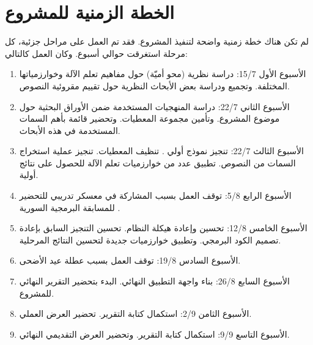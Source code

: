 \section{الخطة الزمنية للمشروع}
لم تكن هناك خطة زمنية واضحة لتنفيذ المشروع.
فقد تم العمل على مراحل جزئية، كل مرحلة استغرقت حوالي أسبوع.
وكان العمل كالتالي:
\begin{enumerate}
	\item 
	الأسبوع الأول 15/7:
	دراسة نظرية (محو أميّة) حول مفاهيم تعلم الآلة وخوارزمياتها المختلفة.
	وتجميع ودراسة بعض الأبحاث النظرية حول تقييم مقروئية النصوص.
	\item
	الأسبوع الثاني 22/7:
	دراسة المنهجيات المستخدمة ضمن الأوراق البحثية حول موضوع المشروع.
	وتأمين مجموعة المعطيات.
	وتحضير قائمة بأهم السمات المستخدمة في هذه الأبحاث.
	\item
	الأسبوع الثالث 22/7:
	تنجيز نموذج أولي .
	تنظيف المعطيات.
	تنجيز عملية استخراج السمات من النصوص.
	تطبيق عدد من خوارزميات تعلم الآلة للحصول على نتائج أولية.
	\item
	الأسبوع الرابع 5/8:
	توقف العمل بسبب المشاركة في معسكر تدريبي للتحضير للمسابقة البرمجية السورية .
	\item
	الأسبوع الخامس 12/8:
	تحسين وإعادة هيكلة النظام.
	تحسين التنجيز السابق بإعادة تصميم الكود البرمجي.
	وتطبيق خوارزميات جديدة لتحسين النتائج المرحلية.
	\item
	الأسبوع السادس 19/8:
	توقف العمل بسبب عطلة عيد الأضحى.
	\item
	الأسبوع السابع 26/8:
	بناء واجهة التطبيق النهائي.
	البدء بتحضير التقرير النهائي للمشروع.
	\item
	الأسبوع الثامن 2/9:
	استكمال كتابة التقرير.
	تحضير العرض العملي.
	\item
	الأسبوع التاسع 9/9:
	استكمال كتابة التقرير.
	وتحضير العرض التقديمي النهائي.
\end{enumerate}








